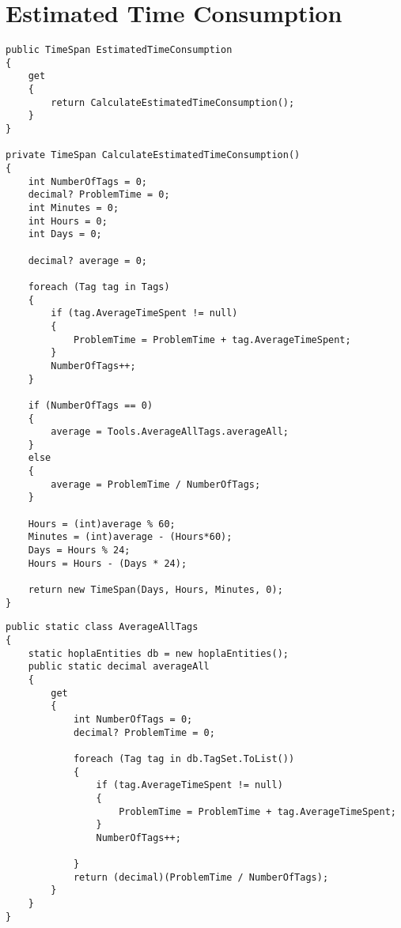 \section{Estimated Time Consumption}
\label{sec:estimated_time_consumption}



\begin{lstlisting}[style=sourceCode, caption=\myCaption{The ManageTagTimes method. In lines one to seven a property is shown, which wraps the method in lines nine to forty-three.}, label=lst:estimatedtimeconsumption,float=hp]
public TimeSpan EstimatedTimeConsumption
{
    get
    {
        return CalculateEstimatedTimeConsumption();
    }
}

private TimeSpan CalculateEstimatedTimeConsumption()
{
    int NumberOfTags = 0;
    decimal? ProblemTime = 0;
    int Minutes = 0;
    int Hours = 0;
    int Days = 0;

    decimal? average = 0;

    foreach (Tag tag in Tags)
    {
        if (tag.AverageTimeSpent != null)
        {
            ProblemTime = ProblemTime + tag.AverageTimeSpent;
        }
        NumberOfTags++;
    }

    if (NumberOfTags == 0)
    {
        average = Tools.AverageAllTags.averageAll;
    }
    else
    {
        average = ProblemTime / NumberOfTags;
    }

    Hours = (int)average % 60;
    Minutes = (int)average - (Hours*60);
    Days = Hours % 24;
    Hours = Hours - (Days * 24);

    return new TimeSpan(Days, Hours, Minutes, 0);
}
\end{lstlisting}

\begin{lstlisting}[style=sourceCode, caption=\myCaption{The \cl{AverageAllTags} class, which is stored in the Tools folder.}, label=lst:averagealltags,float=hp]
public static class AverageAllTags
{
    static hoplaEntities db = new hoplaEntities();
    public static decimal averageAll
    {
        get
        {
            int NumberOfTags = 0;
            decimal? ProblemTime = 0;

            foreach (Tag tag in db.TagSet.ToList())
            {
                if (tag.AverageTimeSpent != null)
                {
                    ProblemTime = ProblemTime + tag.AverageTimeSpent;
                }
                NumberOfTags++;
                
            }
            return (decimal)(ProblemTime / NumberOfTags);
        }
    }
}
\end{lstlisting}


